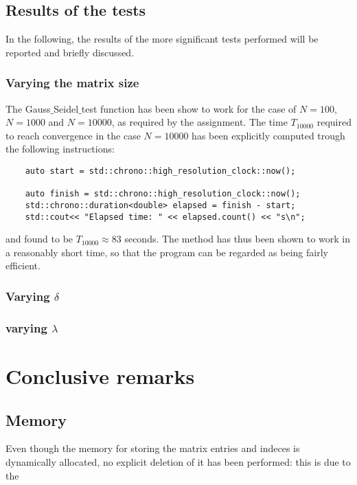 \documentclass{article}
\theoremstyle{theorem}
\theoremstyle{definition}
\begin{document}
\subsection{Results of the tests}
In the following, the results of the more significant tests performed will be reported and briefly discussed.

\subsubsection{Varying the matrix size}
The Gauss$\_$Seidel$\_$test function has been show to work for the case of $N=100$, $N=1000$ and $N=10000$, as required by the assignment.
The time $T_{10000}$ required to reach convergence in the case $N=10000$ has been explicitly computed trough the following instructions:

\begin{verbatim}
	auto start = std::chrono::high_resolution_clock::now();
	
	auto finish = std::chrono::high_resolution_clock::now();
	std::chrono::duration<double> elapsed = finish - start;
	std::cout<< "Elapsed time: " << elapsed.count() << "s\n";
\end{verbatim} 

and found to be $T_{10000}\approx 83$ seconds. The method has thus been shown to work in a reasonably short time, so that the program can be regarded as being fairly efficient. 


\subsubsection{Varying $\delta$}

\subsubsection{varying $\lambda$}



\section{Conclusive remarks}

\subsection{Memory}
Even though the memory for storing the matrix entries and indeces is dynamically allocated, no explicit deletion of it has been performed: this is due to the 
\end{document}
